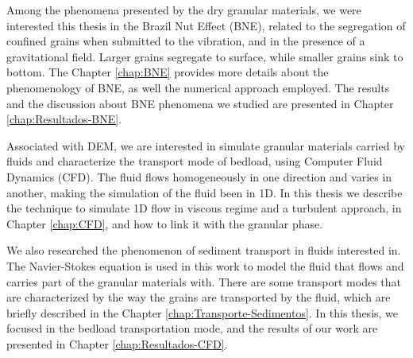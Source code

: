 
    Among the phenomena presented by the dry granular materials, we were interested this thesis in the Brazil Nut Effect (BNE), related to the segregation of confined grains when submitted to the vibration, and in the presence of a gravitational field. Larger grains segregate to surface, while smaller grains sink to bottom. The Chapter \ref{chap:BNE} provides more details about the phenomenology of BNE, as well the numerical approach employed. The results and the discussion about BNE phenomena we studied are presented in Chapter \ref{chap:Resultados-BNE}.

    Associated with DEM, we are interested in simulate granular materials carried by fluids and characterize the transport mode of bedload, using Computer Fluid Dynamics (CFD). The fluid flows homogeneously in one direction and varies in another, making the simulation of the fluid been in 1D. In this thesis we describe the technique to simulate 1D flow in viscous regime and a turbulent approach, in Chapter \ref{chap:CFD}, and how to link it with the granular phase.


    We also researched the phenomenon of sediment transport in fluids interested in. The Navier-Stokes \cite{Physical_Hydrodynamics, Fluid_Mechanics} equation is used in this work to model the fluid that flows and carries part of the granular materials with. There are some transport modes that are characterized by the way the grains are transported by the fluid, which are briefly described in the Chapter \ref{chap:Transporte-Sedimentos}. In this thesis, we focused in the bedload transportation mode, and the results of our work are presented in Chapter \ref{chap:Resultados-CFD}.

